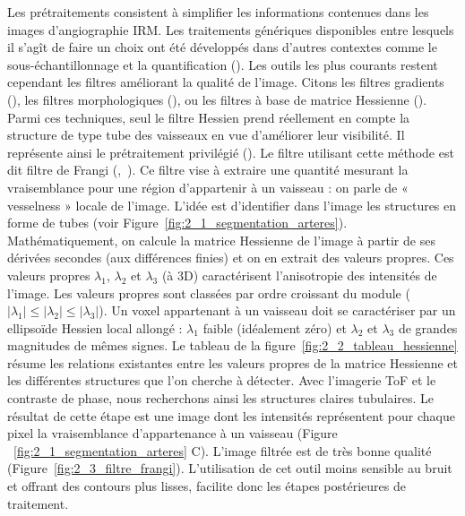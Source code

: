 Les prétraitements consistent à simplifier les informations contenues dans les images d’angiographie IRM. Les traitements génériques disponibles entre lesquels il s’agît de faire un choix ont été développés dans d’autres contextes comme le sous-échantillonnage et la quantification (\cite{Tschirren2005}). Les outils les plus courants restent cependant les filtres améliorant la qualité de l’image. Citons les filtres gradients  (\cite{Koller1995}), les filtres morphologiques (\cite{Wilkinson2001}), ou les filtres à base de matrice Hessienne (\cite{Frangi1998}). Parmi ces techniques, seul le filtre Hessien prend réellement en compte la structure de type tube des vaisseaux en vue d’améliorer leur visibilité. Il représente ainsi le prétraitement privilégié (\cite{Jin2013}). Le filtre utilisant cette méthode est dit filtre de Frangi  (\cite{Frangi1998},~\cite{Manniesing2006}). Ce filtre vise à extraire une quantité mesurant la vraisemblance pour une région d’appartenir à un vaisseau : on parle de  « vesselness » locale de l’image. L’idée est d’identifier dans l’image les structures en forme de tubes (voir Figure~\ref{fig:2_1_segmentation_arteres}). Mathématiquement, on calcule la matrice Hessienne de l’image à partir de ses dérivées secondes (aux différences finies) et on en extrait des valeurs propres. Ces valeurs propres $\lambda_1$, $\lambda_2$ et $\lambda_3$ (à 3D) caractérisent l’anisotropie des intensités de l’image. Les valeurs propres sont classées par ordre croissant du module ($|\lambda_1|\leqslant|\lambda_2|\leqslant|\lambda_3|$). Un voxel appartenant à un vaisseau doit se caractériser par un ellipsoïde Hessien local allongé : $\lambda_1$ faible (idéalement zéro) et $\lambda_2$ et $\lambda_3$ de grandes magnitudes de mêmes signes. Le tableau de la figure~\ref{fig:2_2_tableau_hessienne} résume les relations existantes entre les valeurs propres de la matrice Hessienne et les différentes structures que l’on cherche à détecter. Avec l’imagerie ToF et le contraste de phase, nous recherchons ainsi les structures claires tubulaires. Le résultat de cette étape est une image dont les intensités représentent pour chaque pixel la vraisemblance d’appartenance à un vaisseau (Figure ~\ref{fig:2_1_segmentation_arteres} C). L’image filtrée est de très bonne qualité (Figure~\ref{fig:2_3_filtre_frangi}). L’utilisation de cet outil moins sensible au bruit et offrant des contours plus lisses, facilite donc les étapes postérieures de traitement. 


